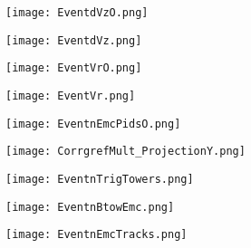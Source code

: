 \documentclass{beamer}
\begin{document}
\begin{frame}
 	\begin{figure}[h!]
	\centering
	\texttt{[image: EventdVzO.png]}
	\end{figure}
\end{frame}

\begin{frame}
 	\begin{figure}[h!]
	\centering
	\texttt{[image: EventdVz.png]}
	\end{figure}
\end{frame}

\begin{frame}
 	\begin{figure}[h!]
	\centering
	\texttt{[image: EventVrO.png]}
	\end{figure}
\end{frame}

\begin{frame}
 	\begin{figure}[h!]
	\centering
	\texttt{[image: EventVr.png]}
	\end{figure}
\end{frame}

\begin{frame}
 	\begin{figure}[h!]
	\centering
	\texttt{[image: EventnEmcPidsO.png]}
	\end{figure}
\end{frame}

\begin{frame}
 	\begin{figure}[h!]
	\centering
	\texttt{[image: CorrgrefMult\_ProjectionY.png]}
	\end{figure}
\end{frame}

\begin{frame}
 	\begin{figure}[h!]
	\centering
	\texttt{[image: EventnTrigTowers.png]}
	\end{figure}
\end{frame}

\begin{frame}
 	\begin{figure}[h!]
	\centering
	\texttt{[image: EventnBtowEmc.png]}
	\end{figure}
\end{frame}

\begin{frame}
 	\begin{figure}[h!]
	\centering
	\texttt{[image: EventnEmcTracks.png]}
	\end{figure}
\end{frame}
\end{document}
